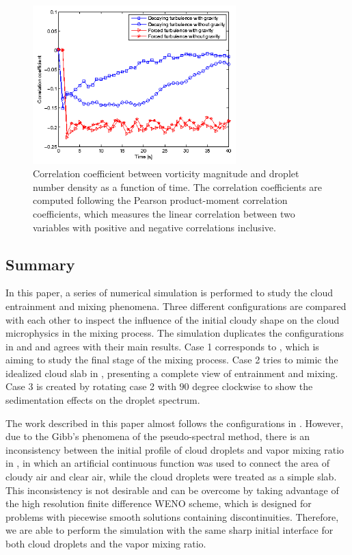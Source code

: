 \begin{figure}[H]\centering
\includegraphics[width=0.7\textwidth]{Figures/correlation} \caption{Correlation
coefficient between vorticity magnitude and droplet number density as a
function of time. The correlation coefficients are computed following the
Pearson product-moment correlation coefficients, which measures the linear
correlation between two variables with positive and negative correlations
inclusive.\label{fig:correlation}} \end{figure}

\subsection{Summary}
In this paper, a series of numerical simulation is performed to study the cloud
entrainment and mixing phenomena. Three different configurations are compared
with each other to inspect the influence of the initial cloudy shape on the
cloud microphysics in the mixing process. The simulation duplicates the
configurations in \cite{Andrejczuk2004} and \cite{Kumar2012Cloud} and agrees with their main
results. Case 1 corresponds to \cite{Andrejczuk2004}, which is aiming to study the final
stage of the mixing process. Case 2 tries to mimic the idealized cloud slab in
\cite{Kumar2012Cloud}, presenting a complete view of entrainment and mixing. Case 3 is
created by rotating case 2 with $90$ degree clockwise to show the sedimentation
effects on the droplet spectrum.

The work described in this paper almost follows the configurations in
\cite{Kumar2012Cloud}. However, due to the Gibb's phenomena of the pseudo-spectral
method, there is an inconsistency between the initial profile of cloud droplets
and vapor mixing ratio in \cite{Kumar2012Cloud}, in which an artificial continuous
function was used to connect the area of cloudy air and clear air, while the
cloud droplets were treated as a simple slab. This inconsistency is not
desirable and can be overcome by taking advantage of the high resolution finite
difference WENO scheme, which is designed for problems with piecewise smooth
solutions containing discontinuities. Therefore, we are able to perform the
simulation with the same sharp initial interface for both cloud droplets and
the vapor mixing ratio.

